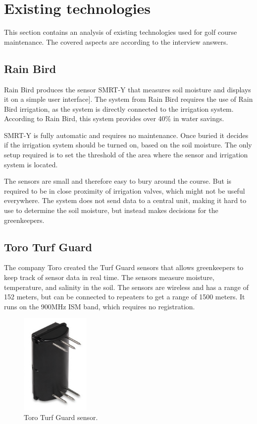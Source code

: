 \section{Existing technologies}
This section contains an analysis of existing technologies used for golf course maintenance. The covered aspects are according to the interview answers.

\subsection{Rain Bird}
Rain Bird produces the sensor SMRT-Y that measures soil moisture and displays it on a simple user interface\cite{smrty}].
The system from Rain Bird requires the use of Rain Bird irrigation, as the system is directly connected to the irrigation system. 
According to Rain Bird, this system provides over 40\% in water savings\cite{smrty2}.

SMRT-Y is fully automatic and requires no maintenance. Once buried it decides if the irrigation system should be turned on, based on the soil moisture. 
The only setup required is to set the threshold of the area where the sensor and irrigation system is located\cite{smrty2}.

The sensors are small and therefore easy to bury around the course. But is required to be in close proximity of irrigation valves, which might not be useful everywhere.
The system does not send data to a central unit, making it hard to use to determine the soil moisture, but instead makes decisions for the greenkeepers. 

\subsection{Toro Turf Guard\texttrademark{}}
The company Toro created the Turf Guard\texttrademark{} sensors that allows greenkeepers to keep track of sensor data in real time. The sensors measure moisture, temperature, and salinity in the soil\cite{turfGuard}.
The sensors are wireless and has a range of 152 meters, but can be connected to repeaters to get a range of 1500 meters\cite{turfGuard}. It runs on the 900MHz ISM band, which requires no registration.

\begin{figure}
\begin{center}
\includegraphics[width=0.3\textwidth]{chapters/analysis/figs/Turfguard.png}
\caption{Toro Turf Guard\texttrademark{} sensor\cite{turfGuard2}.}
\label{fig:turfguard}
\end{center}
\end{figure}

